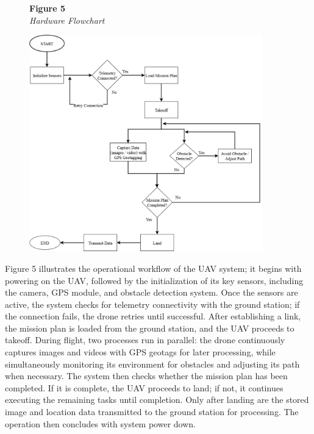 	\begin{figure}[H]
		\raggedright
		\textbf{Figure 5} \\ %
		\textit{Hardware Flowchart} %
		
		\vspace{0.5em}
		\centering
		\includegraphics[width=0.9\textwidth]{figures/HardFlow.pdf} %
		
		\vspace{0.5em}
		\raggedright
		
		\label{fig:HardFlow}
	\end{figure}
	
	Figure 5 illustrates the operational workflow of the UAV system; it begins with powering on the UAV, followed by the initialization of its key sensors, including the camera, GPS module, and obstacle detection system. Once the sensors are active, the system checks for telemetry connectivity with the ground station; if the connection fails, the drone retries until successful. After establishing a link, the mission plan is loaded from the ground station, and the UAV proceeds to takeoff. During flight, two processes run in parallel: the drone continuously captures images and videos with GPS geotags for later processing, while simultaneously monitoring its environment for obstacles and adjusting its path when necessary. The system then checks whether the mission plan has been completed. If it is complete, the UAV proceeds to land; if not, it continues executing the remaining tasks until completion. Only after landing are the stored image and location data transmitted to the ground station for processing. The operation then concludes with system power down.
	
